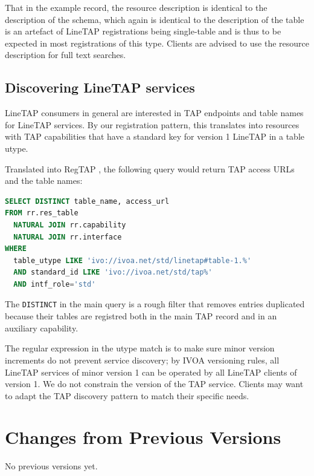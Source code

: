\documentclass[11pt,a4paper]{ivoa}
\begin{document}
That in the example record, the resource description is identical to the
description of the schema, which again is identical to the description
of the table is an artefact of LineTAP registrations being single-table
and is thus to be expected in most registrations of this type.  Clients
are advised to use the resource description for full text searches.


\subsection{Discovering LineTAP services}

LineTAP consumers in general are interested in TAP endpoints and table names for
LineTAP services.  By our registration pattern, this translates into
resources with TAP capabilities that have a standard key for version 1
LineTAP in a table utype.

Translated into RegTAP \citep{2019ivoa.spec.1011D}, the following query
would return TAP access URLs and the table names:

\begin{lstlisting}[language=SQL]
SELECT DISTINCT table_name, access_url
FROM rr.res_table
  NATURAL JOIN rr.capability
  NATURAL JOIN rr.interface
WHERE
  table_utype LIKE 'ivo://ivoa.net/std/linetap#table-1.%'
  AND standard_id LIKE 'ivo://ivoa.net/std/tap%'
  AND intf_role='std'
\end{lstlisting}

The \texttt{DISTINCT} in the main query is a rough filter that removes
entries duplicated because their tables are registred both in the main
TAP record and in an auxiliary capability.

The regular expression in the utype match is to make sure minor version
increments do not prevent service discovery; by IVOA versioning rules,
all LineTAP services of minor version 1 can be operated by all LineTAP
clients of version 1.  We do not constrain the version of the TAP
service. Clients may want to adapt the TAP discovery pattern to match
their specific needs.



\appendix
\section{Changes from Previous Versions}

No previous versions yet.



\end{document}
